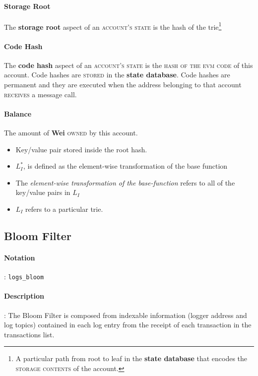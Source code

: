 \documentclass[10pt,a4paper,leqno,bibliography=totoc]{scrartcl}
\newenvironment{alphafootnotes}
{\par\edef\savedfootnotenumber{\number\value{footnote}}
\renewcommand{\thefootnote}{\alph{footnote}}
\setcounter{footnote}{0}}
{\par\setcounter{footnote}{\savedfootnotenumber}}
\begin{document}
\begin{alphafootnotes}
\begin{multicols*}{2}
    				\paragraph{Storage Root}
    					The \textbf{storage root} aspect of an \textsc{account's state} is the hash of the trie\footnote{A particular path from root to leaf in the \textbf{\gls{state database}} that encodes the \textsc{storage contents} of the account.}
    				\paragraph{Code Hash}
    					The \textbf{code hash} aspect of an \textsc{account's state} is the \textsc{hash of the evm code} of this account. Code hashes are \textsc{stored} in the \textbf{\gls{state database}}. Code hashes are permanent and they are executed when the address belonging to that account \textsc{receives} a message call.
    				\paragraph{Balance}
    					The amount of \textbf{Wei} \textsc{owned} by this account. 
					    \begin{itemize}
				            \item Key/value pair stored inside the root hash. 
					    \item $L_I^*$, is defined as the element-wise transformation of the base function
					    \item The \textsl{element-wise transformation of the base-function} refers to all of the key/value pairs in \textit{$L_I$}
					    \item $L_I$ refers to a particular \gls{trie}.
					    \end{itemize}

   		\subsection{Bloom Filter}
				\paragraph{Notation}: \texttt{logs\_bloom}
				\paragraph{Description}: The Bloom Filter is composed from indexable information (logger address and log topics) contained in each log entry from the receipt of each transaction in the transactions list. 


\end{multicols*}
\end{alphafootnotes}
\end{document}
